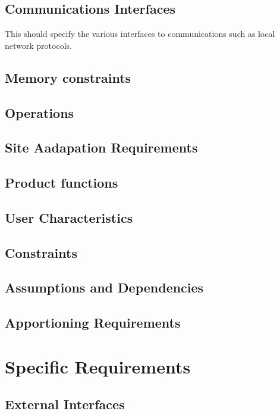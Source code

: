 \documentclass[draftclsnofoot, onecolumn, 10pt]{IEEEtran}
\begin{document}
\subsection{Communications Interfaces}
This should specify the various interfaces to communications such as local network protocols.

\subsection{Memory constraints}

\subsection{Operations}

\subsection{Site Aadapation Requirements}

\subsection{Product functions}

\subsection{User Characteristics}

\subsection{Constraints}

\subsection{Assumptions and Dependencies}

\subsection{Apportioning Requirements}

\section{Specific Requirements}

\subsection{External Interfaces}
\end{document}
